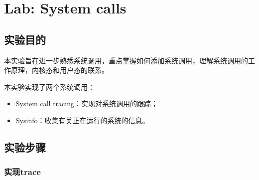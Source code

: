 \section{Lab: System calls}

\subsection{实验目的}

本实验旨在进一步熟悉系统调用，重点掌握如何添加系统调用，理解系统调用的工作原理，内核态和用户态的联系。

本实验实现了两个系统调用：
\begin{itemize}
    \item System call tracing：实现对系统调用的跟踪；
    \item Sysinfo：收集有关正在运行的系统的信息。
\end{itemize}

\subsection{实验步骤}

\subsubsection{实现trace}

